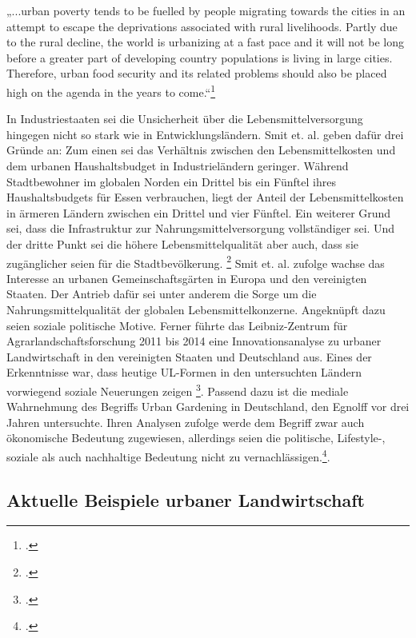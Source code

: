 \documentclass{scrartcl}
\begin{document}
\begin{displayquote}
„\lbrack...\rbrack urban poverty tends to be fuelled by people migrating towards the cities in an attempt to escape the deprivations associated with rural livelihoods. Partly due to the rural decline, the world is urbanizing at a fast pace and it will not be long before a greater part of developing country populations is living in large cities. Therefore, urban food security and its related problems should also be placed high on the agenda in the years to come.“\footcite[S.5f]{FoodandAgricultureOrganizationoftheUnitedNations2006The2006}
\end{displayquote}
In Industriestaaten sei die Unsicherheit über die Lebensmittelversorgung hingegen nicht so stark wie in Entwicklungsländern. Smit et. al. geben dafür drei Gründe an: Zum einen sei das Verhältnis zwischen den Lebensmittelkosten und dem urbanen Haushaltsbudget in Industrieländern geringer. Während Stadtbewohner im globalen Norden ein Drittel bis ein Fünftel ihres Haushaltsbudgets für Essen verbrauchen, liegt der Anteil der Lebensmittelkosten in ärmeren Ländern zwischen ein Drittel und vier Fünftel. Ein weiterer Grund sei, dass die Infrastruktur zur Nahrungsmittelversorgung vollständiger sei. Und der dritte Punkt sei die höhere Lebensmittelqualität aber auch, dass sie zugänglicher seien für die Stadtbevölkerung. \footcites[Vgl.][S.27]{Smit2001UrbanToday} Smit et. al. zufolge wachse das Interesse an urbanen Gemeinschaftsgärten in Europa und den vereinigten Staaten. Der Antrieb dafür sei unter anderem die Sorge um die Nahrungsmittelqualität der globalen Lebensmittelkonzerne. Angeknüpft dazu seien soziale politische Motive. Ferner führte das Leibniz-Zentrum für Agrarlandschaftsforschung 2011 bis 2014 eine Innovationsanalyse zu urbaner Landwirtschaft in den vereinigten Staaten und Deutschland aus. Eines der Erkenntnisse war, dass heutige UL-Formen in den untersuchten Ländern vorwiegend soziale Neuerungen zeigen \footcite{Berges2014UrbaneStadt}. Passend dazu ist die mediale Wahrnehmung des Begriffs Urban Gardening in Deutschland, den Egnolff vor drei Jahren untersuchte. Ihren Analysen zufolge werde dem Begriff zwar auch ökonomische Bedeutung zugewiesen, allerdings seien die politische, Lifestyle-, soziale als auch nachhaltige Bedeutung nicht zu vernachlässigen.\footcite[Vgl.][S.119ff]{Egnolff2015DieIdeal}. 

\subsection{Aktuelle Beispiele urbaner Landwirtschaft}
\end{document}
